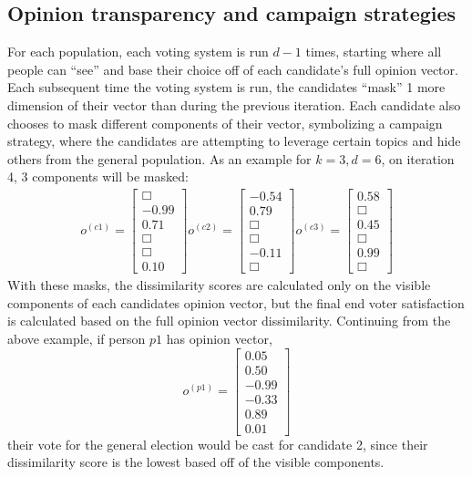 \subsection{Opinion transparency and campaign strategies}
For each population, each voting system is run $d-1$ times, starting where all people can ``see'' and base their choice off of each candidate's full opinion vector.
Each subsequent time the voting system is run, the candidates ``mask'' 1 more dimension of their vector than during the previous iteration.
Each candidate also chooses to mask different components of their vector, symbolizing a campaign strategy, where the candidates are attempting to leverage certain topics and hide others from the general population.
As an example for $k = 3, d = 6$, on iteration 4, 3 components will be masked:
\begin{align*}
o^{(c1)} = \begin{bmatrix}\Box \\ -0.99 \\ 0.71 \\ \Box \\ \Box \\ 0.10  \end{bmatrix}
o^{(c2)} = \begin{bmatrix}-0.54 \\ 0.79 \\ \Box \\ \Box \\ -0.11\\ \Box  \end{bmatrix}
o^{(c3)} = \begin{bmatrix}0.58 \\ \Box \\ 0.45 \\ \Box \\ 0.99 \\ \Box  \end{bmatrix}
\end{align*}
With these masks, the dissimilarity scores are calculated only on the visible components of each candidates opinion vector, but the final end voter satisfaction is calculated based on the full opinion vector dissimilarity.
Continuing from the above example, if person $p1$ has opinion vector, $$o^{(p1)}=\begin{bmatrix}0.05\\0.50\\-0.99\\-0.33\\0.89\\0.01\end{bmatrix}$$ their vote for the general election would be cast for candidate 2, since their dissimilarity score is the lowest based off of the visible components.


